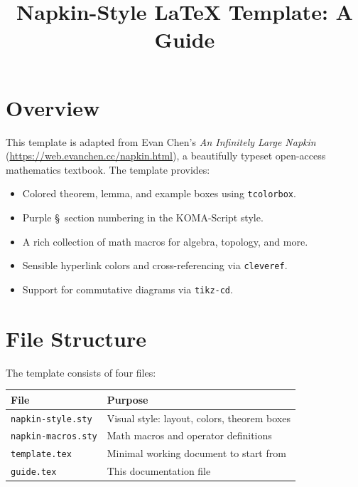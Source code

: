 \documentclass[11pt]{scrartcl}
\title{Napkin-Style \LaTeX{} Template: A Guide}
\author{}
\date{\shortdate}
\begin{document}
\maketitle
\tableofcontents
\newpage

\section{Overview}

This template is adapted from Evan Chen's \emph{An Infinitely Large Napkin}
(\url{https://web.evanchen.cc/napkin.html}), a beautifully typeset open-access
mathematics textbook. The template provides:

\begin{itemize}
    \item Colored theorem, lemma, and example boxes using \texttt{tcolorbox}.
    \item Purple \S~section numbering in the KOMA-Script style.
    \item A rich collection of math macros for algebra, topology, and more.
    \item Sensible hyperlink colors and cross-referencing via \texttt{cleveref}.
    \item Support for commutative diagrams via \texttt{tikz-cd}.
\end{itemize}

\section{File Structure}

The template consists of four files:

\begin{center}
\begin{tabular}{ll}
    \textbf{File} & \textbf{Purpose} \\
    \hline
    \texttt{napkin-style.sty} & Visual style: layout, colors, theorem boxes \\
    \texttt{napkin-macros.sty} & Math macros and operator definitions \\
    \texttt{template.tex} & Minimal working document to start from \\
    \texttt{guide.tex} & This documentation file \\
\end{tabular}
\end{center}
\end{document}
